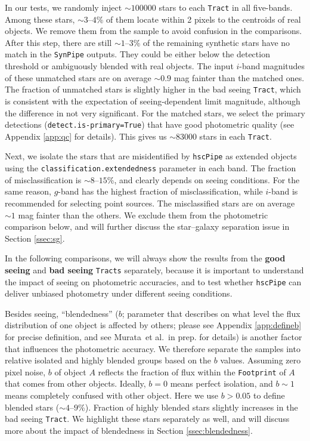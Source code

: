 \documentclass[useamsfonts]{pasj01}
\def\etal{{\ et al.~}}
\def\hscpipe{\texttt{hscPipe}}
\def\synpipe{\texttt{SynPipe}}
\def\tract{\texttt{Tract}}
\def\tracts{\texttt{Tracts}}
\begin{document}
    In our tests, we randomly inject ${\sim}100000$ stars to each \tract{} in all
    five-bands.
    Among these stars, ${\sim}3$--$4$\% of them locate within 2 pixels to the centroids
    of real objects.
    We remove them from the sample to avoid confusion in the comparisons.
    After this step, there are still ${\sim}1$--$3$\% of the remaining synthetic stars
    have no match in the \synpipe{} outputs.
    They could be either below the detection threshold or ambiguously blended with real
    objects.
    The input $i$-band magnitudes of these unmatched stars are on average ${\sim}0.9$
    mag fainter than the matched ones.
    The fraction of unmatched stars is slightly higher in the bad seeing \tract{},
    which is consistent with the expectation of seeing-dependent limit magnitude,
    although the difference in not very significant.
    For the matched stars, we select the primary detections
    (\texttt{detect.is-primary=True}) that have good photometric quality
    (see Appendix \ref{app:qc} for details).
    This gives us ${\sim}83000$ stars in each \tract{}.

    Next, we isolate the stars that are misidentified by \hscpipe{} as extended
    objects using the \texttt{classification.extendedness} parameter in each band.
    The fraction of misclassification is ${\sim}8$--$15$\%, and clearly depends on
    seeing conditions.
    For the same reason, $g$-band has the highest fraction of misclassification,
    while $i$-band is recommended for selecting point sources.
    The misclassified stars are on average ${\sim}1$ mag fainter than the others.
    We exclude them from the photometric comparison below, and will further discuss
    the star--galaxy separation issue in Section \ref{ssec:sg}.

    In the following comparisons, we will always show the results from the
    \textbf{good seeing} and \textbf{bad seeing} \tracts{} separately, because it
    is important to understand the impact of seeing on photometric accuracies,
    and to test whether \hscpipe{} can deliver unbiased photometry under different
    seeing conditions.

    Besides seeing, ``blendedness'' ($b$; parameter that describes on what level
    the flux distribution of one object is affected by others; please see
    Appendix \ref{app:defineb} for precise definition, and see Murata\etal in prep.
    for details) is another factor that influences the photometric accuracy.
    We therefore separate the samples into relative isolated and highly blended
    groups based on the $b$ values.
    Assuming zero pixel noise, $b$ of object $A$ reflects the fraction of flux
    within the \texttt{Footprint} of $A$ that comes from other objects.
    Ideally, $b=0$ means perfect isolation, and $b{\sim}1$ means completely
    confused with other object.
    Here we use $b>0.05$ to define blended stars (${\sim}4$--$9$\%).
    Fraction of highly blended stars slightly increases in the bad seeing \tract{}.
    We highlight these stars separately as well, and will discuss more about the
    impact of blendedness in Section \ref{ssec:blendedness}.
\end{document}
